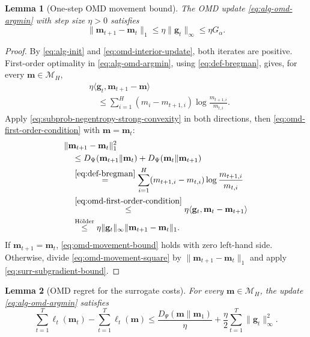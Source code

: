 \documentclass[journal]{IEEEtran}
\newtheorem{lemma}{Lemma}
\theoremstyle{remark}
\begin{document}
\begin{lemma}[One-step OMD movement bound]
\label{lem:omd-move}
The OMD update \eqref{eq:alg-omd-argmin} with step size $\eta>0$ satisfies
\begin{equation}
\label{eq:omd-movement-bound}
\|\mathbf{m}_{t+1}-\mathbf{m}_t\|_1
\le \eta\|\mathbf{g}_t\|_\infty
\le \eta G_\alpha.
\end{equation}
\end{lemma}

\begin{proof}
By \eqref{eq:alg-init} and \eqref{eq:omd-interior-update}, both iterates
are positive. First-order optimality in \eqref{eq:alg-omd-argmin}, using
\eqref{eq:def-bregman}, gives, for every $\mathbf{m}\in\mathcal{M}_H$,
\begin{equation}
\label{eq:omd-first-order-condition}
\begin{aligned}
&\eta\langle\mathbf{g}_t,\mathbf{m}_{t+1}-\mathbf{m}\rangle\\
&\quad\le\sum_{i=1}^H(m_i-m_{t+1,i})
\log\frac{m_{t+1,i}}{m_{t,i}}.
\end{aligned}
\end{equation}
Apply \eqref{eq:subprob-negentropy-strong-convexity} in both directions,
then \eqref{eq:omd-first-order-condition} with $\mathbf{m}=\mathbf{m}_t$:
\begin{equation}
\label{eq:omd-movement-square}
\begin{aligned}
&\|\mathbf{m}_{t+1}-\mathbf{m}_t\|_1^2 \\
&\quad\le
D_\Psi(\mathbf{m}_{t+1}\|\mathbf{m}_t)+D_\Psi(\mathbf{m}_t\|\mathbf{m}_{t+1}) \\
&\quad\overset{\eqref{eq:def-bregman}}{=}
\sum_{i=1}^H(m_{t+1,i}-m_{t,i})
\log\frac{m_{t+1,i}}{m_{t,i}}\\
&\quad\overset{\eqref{eq:omd-first-order-condition}}{\le}
\eta\langle\mathbf{g}_t,\mathbf{m}_t-\mathbf{m}_{t+1}\rangle \\
&\quad\overset{\text{H\"older}}{\le}
\eta\|\mathbf{g}_t\|_\infty\|\mathbf{m}_{t+1}-\mathbf{m}_t\|_1.
\end{aligned}
\end{equation}
If $\mathbf{m}_{t+1}=\mathbf{m}_t$, \eqref{eq:omd-movement-bound} holds
with zero left-hand side. Otherwise, divide \eqref{eq:omd-movement-square}
by $\|\mathbf{m}_{t+1}-\mathbf{m}_t\|_1$ and apply
\eqref{eq:surr-subgradient-bound}.
\end{proof}

\begin{lemma}[OMD regret for the surrogate costs]
\label{lem:omd-surrogate-regret}
For every $\mathbf{m}\in\mathcal{M}_H$, the update \eqref{eq:alg-omd-argmin} satisfies
\begin{equation}
\label{eq:omd-surrogate-regret}
\sum_{t=1}^T\ell_t(\mathbf{m}_t)
-\sum_{t=1}^T\ell_t(\mathbf{m})
\le
\frac{D_\Psi(\mathbf{m}\|\mathbf{m}_1)}{\eta}
+
\frac{\eta}{2}\sum_{t=1}^T\|\mathbf{g}_t\|_\infty^2.
\end{equation}
\end{lemma}
\end{document}
